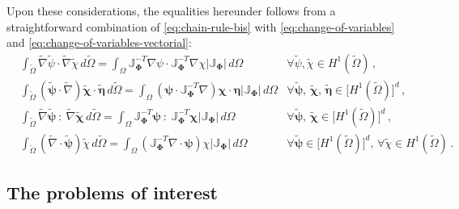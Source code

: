 \documentclass[12pt, a4paper, twoside, openright]{report}
\numberwithin{equation}{chapter}
\theoremstyle{theorem}
\theoremstyle{definition}
\theoremstyle{remark}
\theoremstyle{proposition}
\numberwithin{figure}{chapter}
\newcommand{\wt}[1]{\widetilde{#1}}
\newcommand{\bg}[1]{\boldsymbol{#1}}
\begin{document}
		Upon these considerations, the equalities hereunder follows from a straightforward combination of \eqref{eq:chain-rule-bis} with \eqref{eq:change-of-variables} and \eqref{eq:change-of-variables-vectorial}:
		\begin{align}
			\label{eq:change-of-variables-first}
			& \int_{\wt{\Omega}} \wt{\nabla} \wt{\psi} \cdot \wt{\nabla} \wt{\chi} \, d \wt{\Omega} = \int_{\Omega} \mathbb{J}^{-T}_{\bg{\Phi}} \nabla \psi \cdot \mathbb{J}^{-T}_{\bg{\Phi}} \nabla \chi \lvert \mathbb{J}_{\bg{\Phi}} \rvert \, d \Omega & \forall \wt{\psi}, \wt{\chi} \in H^1(\wt{\Omega}) \, , \\
			\label{eq:change-of-variables-second}
			& \int_{\wt{\Omega}} \left( \wt{\bg{\psi}} \cdot \wt{\nabla} \right) \wt{\bg{\chi}} \cdot \wt{\bg{\eta}} \, d \wt{\Omega} = \int_{\Omega} \left( \bg{\psi} \cdot \mathbb{J}^{-T}_{\bg{\Phi}} \nabla \right) \bg{\chi} \cdot \bg{\eta} \lvert \mathbb{J}_{\bg{\Phi}} \rvert \, d \Omega & \forall \wt{\bg{\psi}}, \, \wt{\bg{\chi}}, \, \wt{\bg{\eta}} \in \big[ H^1(\wt{\Omega}) \big]^d \, , \\
			\label{eq:change-of-variables-third}
			& \int_{\wt{\Omega}} \wt{\nabla} \wt{\bg{\psi}} ~ : ~ \wt{\nabla} \wt{\bg{\chi}} \, d \wt{\Omega} = \int_{\Omega} \mathbb{J}^{-T}_{\bg{\Phi}} \bg{\psi} ~ : ~ \mathbb{J}^{-T}_{\bg{\Phi}} \bg{\chi} \lvert \mathbb{J}_{\bg{\Phi}} \rvert \, d \Omega & \forall \wt{\bg{\psi}}, \, \wt{\bg{\chi}} \in \big[ H^1(\wt{\Omega}) \big]^d \, , \\
			\label{eq:change-of-variables-fourth}
			& \int_{\wt{\Omega}} \left( \wt{\nabla} \cdot \wt{\bg{\psi}} \right) \wt{\chi} \, d \wt{\Omega} = \int_{\Omega} \left( \mathbb{J}^{-T}_{\bg{\Phi}} \nabla \cdot \bg{\psi} \right) \chi \lvert \mathbb{J}_{\bg{\Phi}} \rvert \, d \Omega & \forall \wt{\bg{\psi}} \in \big[ H^1(\wt{\Omega}) \big]^d, \, \forall \wt{\chi} \in H^1(\wt{\Omega}) \, .
		\end{align}  
		
	\vspace*{0.3cm}
		
	\subsection{The problems of interest}
	\label{section:The problems of interest}
	
\end{document}
